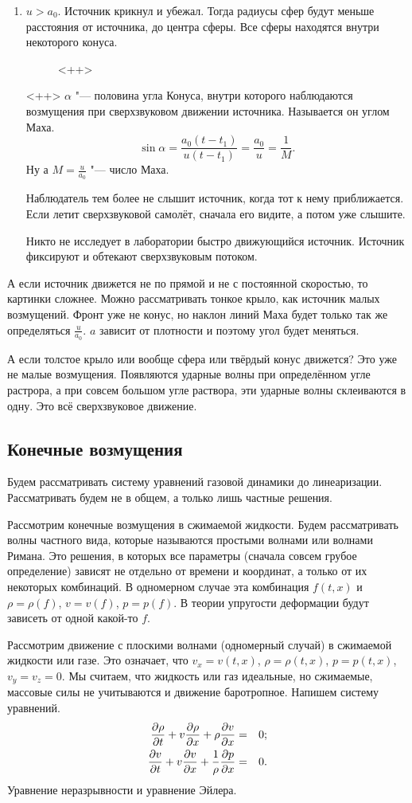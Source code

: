\begin{enumerate}
\item $u>a_0$. Источник крикнул и убежал. Тогда радиусы сфер будут меньше расстояния от источника, до центра сферы. Все сферы находятся внутри некоторого конуса.
\begin{figure}[H]
\centering
{}<++>
\end{figure}<++>
$\alpha$ "--- половина угла Конуса, внутри которого наблюдаются возмущения при сверхзвуковом движении источника. Называется он углом Маха.
\[
  \sin\alpha = \frac{a_0(t-t_1)}{u(t-t_1)} = \frac{a_0}u = \frac1M.
\]
Ну а $M = \frac u{a_0}$ "--- число Маха.

Наблюдатель тем более не слышит источник, когда тот к нему приближается. Если летит сверхзвуковой самолёт, сначала его видите, а потом уже слышите.

Никто не исследует в лаборатории быстро движующийся источник. Источник фиксируют и обтекают сверхзвуковым потоком.
\end{enumerate}

А если источник движется не по прямой и не с постоянной скоростью, то картинки сложнее. Можно рассматривать тонкое крыло, как источник малых возмущений. Фронт уже не конус, но наклон линий Маха будет только так же определяться $\frac u{a_0}$. $a$ зависит от плотности  и поэтому угол будет меняться.

А если толстое крыло или вообще сфера или твёрдый конус движется? Это уже не малые возмущения. Появляются ударные волны при определённом угле растрора, а при совсем большом угле раствора, эти ударные волны склеиваются в одну. Это всё сверхзвуковое движение.

\subsection{Конечные возмущения}
Будем рассматривать систему уравнений газовой динамики до линеаризации. Рассматривать будем не в общем, а только лишь частные решения.

Рассмотрим конечные возмущения в сжимаемой жидкости. Будем рассматривать волны частного вида, которые называются простыми волнами или волнами Римана. Это решения, в которых все параметры (сначала совсем грубое определение) зависят не отдельно от времени и координат, а только от их некоторых комбинаций. В одномерном случае эта комбинация $f(t,x)$ и $\rho = \rho(f)$, $v = v(f)$, $p = p(f)$. В теории упругости деформации будут зависеть от одной какой-то $f$.

Рассмотрим движение с плоскими волнами (одномерный случай) в сжимаемой жидкости или газе. Это означает, что $v_x = v(t,x)$, $\rho = \rho(t,x)$, $p = p(t,x)$, $v_y=v_z=0$. Мы считаем, что жидкость или газ идеальные, но сжимаемые, массовые силы не учитываются и движение баротропное.
Напишем систему уравнений.
\begin{eqnarray*}
  \frac{\partial \rho}{\partial t} + v\frac{\partial \rho}{\partial x} + \rho \frac{\partial v}{\partial x} &=& 0;\\
  \frac{\partial v}{\partial t} + v\frac{\partial v}{\partial x} + \frac1\rho\frac{\partial p}{\partial x} &=& 0.
\end{eqnarray*}
Уравнение неразрывности и уравнение Эйлера.
